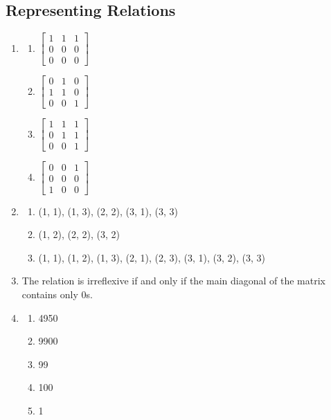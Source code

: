 \documentclass{sig-alternate-05-2015}
\begin{document}
\subsection{Representing Relations}
\begin{enumerate}
\item 
\begin{enumerate}
	\item 
	$\begin{bmatrix}
		1 & 1 & 1\\
		0 & 0 & 0\\
		0 & 0 & 0
	\end{bmatrix}$
	\item 
	$\begin{bmatrix}
	0 & 1 & 0\\
	1 & 1 & 0\\
	0 & 0 & 1
	\end{bmatrix}$
	\item 
	$\begin{bmatrix}
	1 & 1 & 1\\
	0 & 1 & 1\\
	0 & 0 & 1
	\end{bmatrix}$
	\item 
	$\begin{bmatrix}
	0 & 0 & 1\\
	0 & 0 & 0\\
	1 & 0 & 0
	\end{bmatrix}$
\end{enumerate}

\item \begin{enumerate}
	\item (1, 1), (1, 3), (2, 2), (3, 1), (3, 3) 
	\item (1, 2), (2, 2), (3, 2)
	\item (1, 1), (1, 2), (1, 3), (2, 1), (2, 3), (3, 1), (3, 2),
	(3, 3)
\end{enumerate}

\item The relation is irreflexive if and only if the main diagonal of the matrix contains only $0$s.

\item \begin{enumerate}
	\item 4950 
	\item 9900
	\item 99
	\item 100
	\item 1
\end{enumerate}


\end{enumerate}
\end{document}

